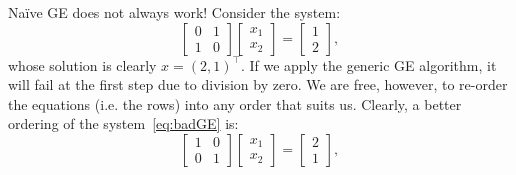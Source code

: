 Na\"ive GE does not always work! Consider the system:
\begin{equation}\label{eq:badGE}
\begin{bmatrix} 0 & 1\\ 1 & 0\end{bmatrix}\begin{bmatrix}x_1\\x_2\end{bmatrix} = \begin{bmatrix} 1\\2\end{bmatrix},
\end{equation}
whose solution is clearly $x = (2,1)^\top$. If we apply the generic GE algorithm, it will fail at the first step due to division by zero. We are free, however, to re-order the equations (i.e. the rows) into any order that suits us. Clearly, a better ordering of the system~\eqref{eq:badGE} is:
\begin{equation}\label{eq:goodGE}
\begin{bmatrix} 1 & 0\\ 0 & 1\end{bmatrix}\begin{bmatrix}x_1\\x_2\end{bmatrix} = \begin{bmatrix} 2\\1\end{bmatrix},
\end{equation}

